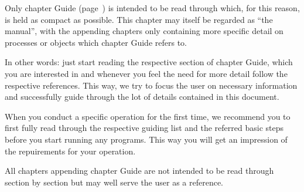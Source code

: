 %
%
%
Only chapter Guide (page~\pageref{guide}) is intended to be read through which, for this reason, is held as compact 
as possible. This chapter may itself be regarded as ``the manual'', with the appending chapters only 
containing more specific detail on processes or objects which chapter Guide refers to.

In other words: just start reading the respective section of chapter Guide, which you are interested in 
and whenever you feel the need for more detail follow the respective references. This way, we try to focus
the user on necessary information and successfully guide through the lot of details contained in this document. 

When you conduct a specific \ASKI operation for the first time, we recommend you to first fully read through the 
respective guiding list and the referred basic steps before you start running any programs. This way you will 
get an impression of the repuirements for your operation.

All chapters appending chapter Guide are not intended to be read through section by section but may well
serve the user as a reference. 

